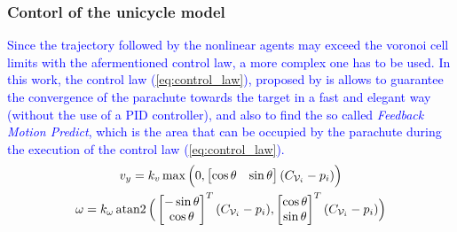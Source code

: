 \subsubsection{Contorl of the unicycle model}
\textcolor{blue}{Since the trajectory followed by the nonlinear agents may exceed the voronoi cell limits with the afermentioned control law, a more complex one has to be used. In this work, the control law (\ref{eq:control_law}), proposed by \cite{b4} is allows to guarantee the convergence of the parachute towards the target in a fast and elegant way (without the use of a PID controller), and also to find the so called \textit{Feedback Motion Predict}, which is the area that can be occupied by the parachute during the execution of the control law (\ref{eq:control_law}).}
\begin{equation}
\label{eq:control_law}
    \begin{gathered}
        v_y = k_v\max\Big(0,\begin{bmatrix}
           \cos{\theta} & \sin{\theta}
       \end{bmatrix}(C_{\mathcal{V}_i} -p_i)\Big)\\
        \omega = k_{\omega}\atantwo\Big(\begin{bmatrix}
           -\sin{\theta} \\ \cos{\theta}
       \end{bmatrix}^T(C_{\mathcal{V}_i} -p_i),\begin{bmatrix}
           \cos{\theta} \\ \sin{\theta}
       \end{bmatrix}^T(C_{\mathcal{V}_i} -p_i)\Big)
    \end{gathered}
\end{equation}
